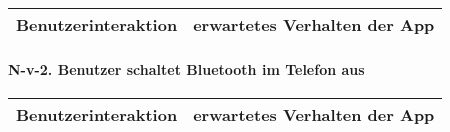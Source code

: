 \begin{longtable}{p{8cm}p{8.5cm}}
\toprule
Benutzerinteraktion & erwartetes Verhalten der App\tabularnewline
\midrule
\endhead
\bottomrule
\end{longtable}

\paragraph{N-v-2. Benutzer schaltet Bluetooth im Telefon
aus}\label{benutzer-schaltet-bluetooth-im-telefon-aus}

\begin{longtable}{p{8cm}p{8.5cm}}
\toprule
Benutzerinteraktion & erwartetes Verhalten der App\tabularnewline
\midrule
\endhead
\bottomrule
\end{longtable}

